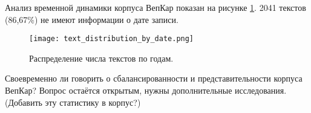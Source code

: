 Анализ временной динамики корпуса ВепКар показан на рисунке \ref{fig:text_distribution_by_date}. 2041 текстов (86,67\%) не имеют информации о дате записи.
\begin{figure}
    \centering
    \texttt{[image: text\_distribution\_by\_date.png]}
    \caption{Распределение числа текстов по годам.}
    \label{fig:text_distribution_by_date}
\end{figure}

Своевременно ли говорить о сбалансированности и представительности корпуса ВепКар? Вопрос остаётся открытым, нужны дополнительные исследования.
(Добавить эту статистику в корпус?)


